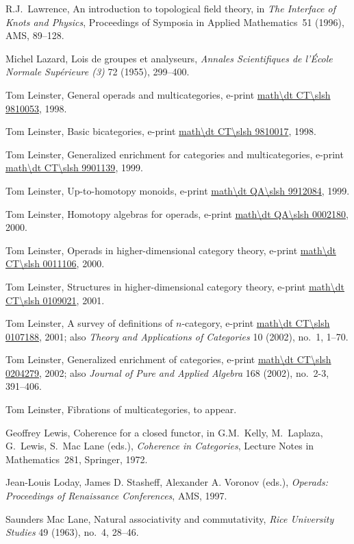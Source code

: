 \begin{thebibliography}{c9999}
R.J.~Lawrence,
An introduction to topological field theory,
in \emph{The Interface of Knots and Physics}, 
Proceedings of Symposia in Applied Mathematics~51 (1996), AMS, 89--128.

Michel Lazard,
Lois de groupes et analyseurs,
\emph{Annales Scientifiques de l'\'Ecole Normale Sup\'erieure (3)}
72 (1955), 299--400.

Tom Leinster,
General operads and multicategories,
e-print \url{math\dt CT\slsh 9810053}, 1998.

Tom Leinster,
Basic bicategories,
e-print \url{math\dt CT\slsh 9810017}, 1998.

Tom Leinster,
Generalized enrichment for categories and multicategories,
e-print \url{math\dt CT\slsh 9901139}, 1999.

Tom Leinster,
Up-to-homotopy monoids,
e-print \url{math\dt QA\slsh 9912084}, 1999.

Tom Leinster,
Homotopy algebras for operads,
e-print \url{math\dt QA\slsh 0002180}, 2000.

Tom Leinster,
Operads in higher-dimensional category theory,
e-print \url{math\dt CT\slsh 0011106}, 2000.

Tom Leinster,
Structures in higher-dimensional category theory,
e-print \url{math\dt CT\slsh 0109021}, 2001.

Tom Leinster, 
A survey of definitions of $n$-category,
e-print \url{math\dt CT\slsh 0107188}, 2001;
also
\emph{Theory and Applications of Categories} 10 (2002), no.~1, 1--70.

Tom Leinster, 
Generalized enrichment of categories,
e-print \url{math\dt CT\slsh 0204279}, 2002; 
also
\emph{Journal of Pure and Applied Algebra} 168 (2002), no.~2-3, 391--406.

Tom Leinster, 
Fibrations of multicategories,
to appear.

Geoffrey Lewis, 
Coherence for a closed functor, 
in
G.M.~Kelly, M.~Laplaza, G.~Lewis, S.~Mac Lane (eds.), 
\emph{Coherence in Categories}, Lecture Notes in Mathematics~281, 
Springer, 1972.

Jean-Louis Loday, James D. Stasheff, Alexander A. Voronov (eds.), 
\emph{Operads: Proceedings of Renaissance Conferences}, AMS, 1997.

Saunders Mac Lane, 
Natural associativity and commutativity,
\emph{Rice University Studies} 49 (1963), no.~4, 28--46.


\end{thebibliography}
